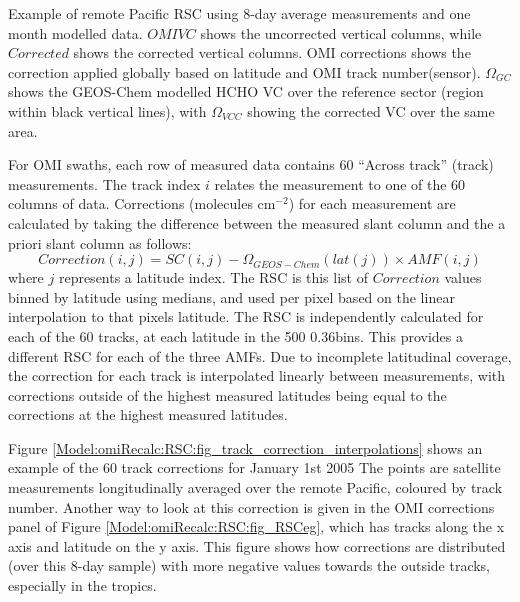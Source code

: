    
    {%
      Example of remote Pacific RSC using 8-day average measurements and one month modelled data.
      $OMI VC$ shows the uncorrected vertical columns, while $Corrected$ shows the corrected vertical columns.
      OMI corrections shows the correction applied globally based on latitude and OMI track number(sensor).
      $\Omega_{GC}$ shows the GEOS-Chem modelled HCHO VC over the reference sector (region within black vertical lines), with $\Omega_{VCC}$ showing the corrected VC over the same area.
    }
    {\label{Model:omiRecalc:RSC:fig_RSCeg}}
    
    
    For OMI swaths, each row of measured data contains 60 ``Across track'' (track) measurements.
    The track index $i$ relates the measurement to one of the 60 columns of data.
    Corrections (molecules cm$^{-2}$) for each measurement are calculated by taking the difference between the measured slant column and the a priori slant column as follows:
    \begin{equation} \label{Model:omiRecalc:eqn_RSC}
      Correction(i,j) = SC(i,j) - \Omega_{GEOS-Chem}(lat(j)) \times {AMF}(i,j)
    \end{equation}
    where $j$ represents a latitude index.
    The RSC is this list of $Correction$ values binned by latitude using medians, and used per pixel based on the linear interpolation to that pixels latitude.
    The RSC is independently calculated for each of the 60 tracks, at each latitude in the 500 0.36\degr bins.
    This provides a different RSC for each of the three AMFs.
    Due to incomplete latitudinal coverage, the correction for each track is interpolated linearly between measurements, with corrections outside of the highest measured latitudes being equal to the corrections at the highest measured latitudes.
    
    Figure \ref{Model:omiRecalc:RSC:fig_track_correction_interpolations} shows an example of the 60 track corrections for January 1st 2005
    The points are satellite measurements longitudinally averaged over the remote Pacific, coloured by track number.
    Another way to look at this correction is given in the OMI corrections panel of Figure \ref{Model:omiRecalc:RSC:fig_RSCeg}, which has tracks along the x axis and latitude on the y axis.
    This figure shows how corrections are distributed (over this 8-day sample) with more negative values towards the outside tracks, especially in the tropics.
    
